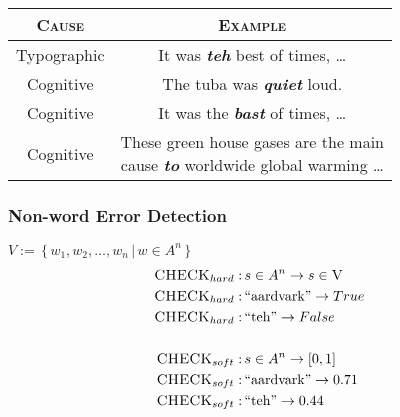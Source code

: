 \begin{frame}
\begin{table}
{
    \def\arraystretch{2}
    \begin{tabular}{cc}
    \textsc{Cause} & \textsc{Example} \\
    \hline
    Typographic & It was \textbf{\textit{teh}} best of times, \ldots \\
    Cognitive & The tuba was \textbf{\textit{quiet}} loud. \\
    Cognitive & It was the \textbf{\textit{bast}} of times, \ldots \\
    Cognitive & \parbox{7cm}{\centering These green house gases are the main \\ cause \textbf{\textit{to}} worldwide global warming \ldots} \\
    \end{tabular}
}
\end{table}
\end{frame}

\begin{frame}
\frametitle{Non-word Error Detection}
\centering
$V := \,\{\, w_1, w_2, \ldots, w_n \,|\, w \in A^n\,\}$ \\ 
\begin{align*}
\textsc{CHECK}_{hard}:&\,s \in A^n \to s \in \textsc{V} \\
\textsc{CHECK}_{hard}:&\,\text{``aardvark''} \to True \\
\textsc{CHECK}_{hard}:&\,\text{``teh''} \to False \\
\\
\textsc{CHECK}_{soft}:&\,s \in A^n \to [0,1]  \\
\textsc{CHECK}_{soft}:&\,\text{``aardvark''} \to 0.71 \\
\textsc{CHECK}_{soft}:&\,\text{``teh''} \to 0.44 \\
\end{align*}
\end{frame}

